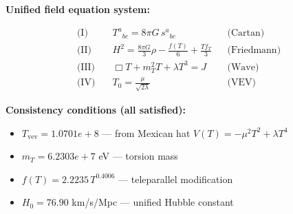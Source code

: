
\textbf{Unified field equation system:}

\begin{align}
  \text{(I)} \quad & T^a{}_{bc} = 8\pi G \, s^a{}_{bc} && \text{(Cartan)} \\
  \text{(II)} \quad & H^2 = \frac{8\pi G}{3}\rho - \frac{f(T)}{6} + \frac{Tf_T}{3} && \text{(Friedmann)} \\
  \text{(III)} \quad & \Box T + m_T^2 T + \lambda T^3 = J && \text{(Wave)} \\
  \text{(IV)} \quad & T_0 = \frac{\mu}{\sqrt{2\lambda}} && \text{(VEV)}
\end{align}

\textbf{Consistency conditions (all satisfied):}
\begin{itemize}
  \item $T_{\text{vev}} = 1.0701e+8$ — from Mexican hat $V(T) = -\mu^2 T^2 + \lambda T^4$
  \item $m_T = 6.2303e+7$ eV — torsion mass
  \item $f(T) = 2.2235 \, T^{0.4006}$ — teleparallel modification
  \item $H_0 = 76.90$ km/s/Mpc — unified Hubble constant
\end{itemize}